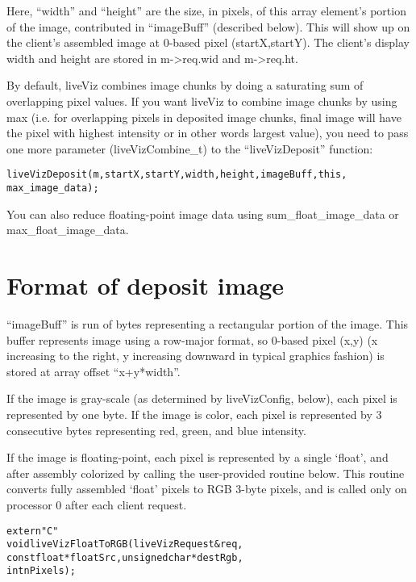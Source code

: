 Here, ``width'' and ``height'' are the size, in pixels, of this array
element's portion of the image, contributed in ``imageBuff'' (described below).
This will show up on the client's assembled image at 0-based pixel
(startX,startY).  The client's display width and height are stored
in m->req.wid and m->req.ht.

By default, liveViz combines image chunks by doing a saturating sum of 
overlapping pixel values. If you want liveViz to combine image chunks by using 
max (i.e. for overlapping pixels in deposited image chunks, final image will 
have the pixel with highest intensity or in other words largest value), you need
to pass one more parameter (liveVizCombine\_t) to the ``liveVizDeposit'' function:

\begin{alltt}
 liveVizDeposit (m, startX, startY, width, height, imageBuff, this, 
                   max\_image\_data);
\end{alltt}

You can also reduce floating-point image data using
 sum\_float\_image\_data or max\_float\_image\_data.


\section{Format of deposit image}

``imageBuff'' is run of bytes representing a rectangular portion
of the image.  This buffer represents image using a row-major format,
so 0-based pixel (x,y) (x increasing to the right, y increasing downward
in typical graphics fashion) is stored at array offset ``x+y*width''.

If the image is gray-scale (as determined by liveVizConfig, below), each pixel
is represented by one byte.  If the image is color, each pixel is represented
by 3 consecutive bytes representing red, green, and blue intensity.

If the image is floating-point, each pixel is represented by a single
`float', and after assembly colorized by calling the user-provided
routine below.  This routine converts fully assembled `float' pixels 
to RGB 3-byte pixels, and is called only on processor 0 after each
client request.

\begin{alltt}
extern "C"
void liveVizFloatToRGB(liveVizRequest &req, 
        const float *floatSrc, unsigned char *destRgb,
        int nPixels);
\end{alltt}


